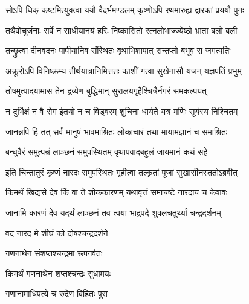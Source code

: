 \twolineshloka
{सोऽपि धिक् कष्टमित्युक्त्वा ययौ वैदर्भमण्डलम्}
{कृष्णोऽपि रथमारुह्य द्वारकां प्रययौ पुनः}%

\twolineshloka
{तथैवोचुर्जनाः सर्वे न साधीयानयं हरिः}
{निष्कासितो रत्नलोभाज्ज्येष्ठो भ्राता बलो बली}%

\twolineshloka
{तच्छ्रुत्वा दीनवदनः पापीयानिव संस्थितः}
{वृथाभिशापात् सन्तप्तो बभूव स जगत्पतिः}%

\twolineshloka
{अक्रूरोऽपि विनिष्क्रम्य तीर्थयात्रानिमित्ततः}
{काशीं गत्वा सुखेनासौ यजन् यज्ञपतिं प्रभुम्}%

\twolineshloka
{तोषमुत्पादयामास तेन द्रव्येण बुद्धिमान्}
{सुरालयगृहैश्चित्रैर्नगरं समकल्पयत्}%

\twolineshloka
{न दुर्भिक्षं न वै रोग ईतयो न च विड्वरम्}
{शुचिना धार्यते यत्र मणिः सूर्यस्य निश्चितम्}%

\twolineshloka
{जानन्नपि हि तत् सर्वं मानुषं भावमाश्रितः}
{लोकाचारं तथा मायामज्ञानं च समाश्रितः}%

\twolineshloka
{बन्धुवैरं समुत्पन्नं लाञ्छनं समुपस्थितम्}
{वृथापवादबहुलं जायमानं कथं सहे}%

\twolineshloka
{इति चिन्तातुरं कृष्णं नारदः समुपस्थितः}
{गृहीत्वा तत्कृतां पूजां सुखासीनस्ततोऽब्रवीत्}%


\twolineshloka
{किमर्थं खिद्यसे देव किं वा ते शोककारणम्}
{यथावृत्तं समाचष्टे नारदाय च केशवः}%


\twolineshloka
{जानामि कारणं देव यदर्थं लाञ्छनं तव}
{त्वया भाद्रपदे शुक्लचतुर्थ्यां चन्द्रदर्शनम्}%



\onelineshloka
{वद नारद मे शीघ्रं को दोषश्चन्द्रदर्शने}%



\onelineshloka
{गणनाथेन संशप्तश्चन्द्रमा रूपगर्वतः}%


\onelineshloka
{किमर्थं गणनाथेन शप्तश्चन्द्रः सुधामयः}%


\onelineshloka
{गणानामाधिपत्ये च रुद्रेण विहितः पुरा}%

